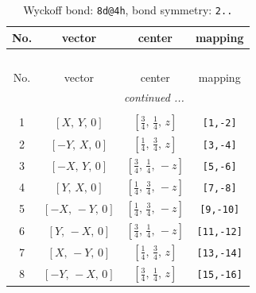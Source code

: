 \documentclass[fleqn,8pt]{jsarticle}
\begin{document}
\begin{longtable}{cccc}
\caption{Wyckoff bond: {\tt 8d@4h}, bond symmetry: {\tt 2..}}
 \\
 \hline \hline
No. & vector & center & mapping \\ \hline \endfirsthead

\multicolumn{3}{l}{\tablename\ \thetable{}} \\
 \hline \hline
No. & vector & center & mapping \\ \hline \endhead

 \hline \hline
\multicolumn{3}{r}{\footnotesize\it continued ...} \\ \endfoot

 \hline \hline
\multicolumn{3}{r}{} \\ \endlastfoot

1 & $\left[ X,\, Y,\, 0 \right]$ & $\left[ \frac{3}{4},\, \frac{1}{4},\, z \right]$ & {\tt [1,-2]} \\ \hline
2 & $\left[ - Y,\, X,\, 0 \right]$ & $\left[ \frac{1}{4},\, \frac{3}{4},\, z \right]$ & {\tt [3,-4]} \\ \hline
3 & $\left[ - X,\, Y,\, 0 \right]$ & $\left[ \frac{3}{4},\, \frac{1}{4},\, - z \right]$ & {\tt [5,-6]} \\ \hline
4 & $\left[ Y,\, X,\, 0 \right]$ & $\left[ \frac{1}{4},\, \frac{3}{4},\, - z \right]$ & {\tt [7,-8]} \\ \hline
5 & $\left[ - X,\, - Y,\, 0 \right]$ & $\left[ \frac{1}{4},\, \frac{3}{4},\, - z \right]$ & {\tt [9,-10]} \\ \hline
6 & $\left[ Y,\, - X,\, 0 \right]$ & $\left[ \frac{3}{4},\, \frac{1}{4},\, - z \right]$ & {\tt [11,-12]} \\ \hline
7 & $\left[ X,\, - Y,\, 0 \right]$ & $\left[ \frac{1}{4},\, \frac{3}{4},\, z \right]$ & {\tt [13,-14]} \\ \hline
8 & $\left[ - Y,\, - X,\, 0 \right]$ & $\left[ \frac{3}{4},\, \frac{1}{4},\, z \right]$ & {\tt [15,-16]} \\
\end{longtable}
\renewcommand{\arraystretch}{1.2}
\end{document}
